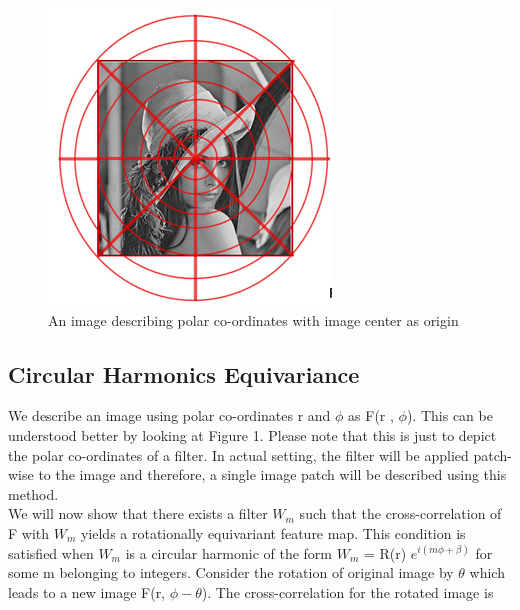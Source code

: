 \documentclass{article}
\begin{document}
\begin{figure}[t!]
  \includegraphics[width=\linewidth]{PolarImage.png}
  \caption{An image describing polar co-ordinates with image center as origin}
  \label{fig:polarCoord}
\end{figure}


\subsection{Circular Harmonics Equivariance}
We describe an image using polar co-ordinates r and $\phi$ as F(r , $\phi$). This can be understood better by looking at Figure 1. Please note that this is just to depict the polar co-ordinates of a filter. In actual setting, the filter will be applied patch-wise to the image and therefore, a single image patch will be described using this method. \\
We will now show that there exists a filter $W_m$ such that the cross-correlation of F with $W_m$ yields a rotationally equivariant feature map. This condition is satisfied when $W_m$ is a circular harmonic of the form $W_m$ = R(r) $e^{i(m \phi + \beta)}$ for some m belonging to integers. Consider the rotation of original image by $\theta$ which leads to a new image F(r, $\phi - \theta$). The cross-correlation for the rotated image is
\end{document}
